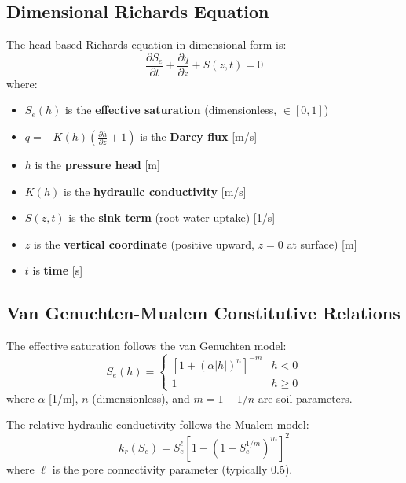 \documentclass[11pt,a4paper]{article}
\begin{document}
\subsection{Dimensional Richards Equation}

The head-based Richards equation in dimensional form is:
\begin{equation}
    \frac{\partial S_e}{\partial t} + \frac{\partial q}{\partial z} + S(z,t) = 0
    \label{eq:richards_dim}
\end{equation}
where:
\begin{itemize}
    \item $S_e(h)$ is the \textbf{effective saturation} (dimensionless, $\in [0,1]$)
    \item $q = -K(h)\left(\frac{\partial h}{\partial z} + 1\right)$ is the \textbf{Darcy flux} [m/s]
    \item $h$ is the \textbf{pressure head} [m]
    \item $K(h)$ is the \textbf{hydraulic conductivity} [m/s]
    \item $S(z,t)$ is the \textbf{sink term} (root water uptake) [1/s]
    \item $z$ is the \textbf{vertical coordinate} (positive upward, $z=0$ at surface) [m]
    \item $t$ is \textbf{time} [s]
\end{itemize}

\subsection{Van Genuchten-Mualem Constitutive Relations}

The effective saturation follows the van Genuchten model:
\begin{equation}
    S_e(h) = \begin{cases}
        \left[1 + (\alpha |h|)^n\right]^{-m} & h < 0 \\
        1 & h \geq 0
    \end{cases}
    \label{eq:vg_se}
\end{equation}
where $\alpha$ [1/m], $n$ (dimensionless), and $m = 1 - 1/n$ are soil parameters.

The relative hydraulic conductivity follows the Mualem model:
\begin{equation}
    k_r(S_e) = S_e^\ell \left[1 - \left(1 - S_e^{1/m}\right)^m\right]^2
    \label{eq:mualem_kr}
\end{equation}
where $\ell$ is the pore connectivity parameter (typically 0.5).
\end{document}
